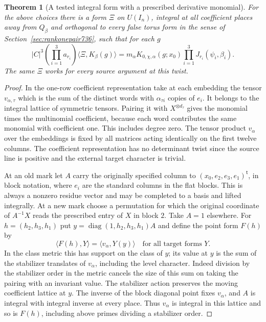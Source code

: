 \documentclass[a4paper,11pt]{article}
\newtheorem{theorem}[proposition]{Theorem}
\theoremstyle{definition}
\theoremstyle{remark}
\numberwithin{equation}{section}
\begin{document}
\begin{theorem}[A tested integral form with a prescribed derivative monomial]
\leavevmode\label{thm:fourblock854}
For the above choices there is a form \(\Xi\) on \(U(I_n)\),
integral at all coefficient places away from \(Q_\beta\)
and orthogonal to every false torus form in the sense of
Section~\ref{sec:rankonepair736}, such that for each \(g\)
\[
 |C|^3\left(\prod_{i=1}^3 a_{r_i}\right)
           \langle\Xi,K_\beta(g)\rangle
    =m_\alpha K_{0,\chi,\alpha}(g;x_0)
                          \prod_{i=1}^3 J_{r_i}(\psi_i,\beta_i).
\]
The same \(\Xi\) works for every source argument at this twist.
\end{theorem}
\begin{proof}
In the one-row coefficient representation take at each
embedding the tensor \(v_{\alpha,\tau}\) which is the sum of
the distinct words with \(\alpha_{\tau i}\) copies of \(e_i\).
It belongs to the integral lattice of symmetric tensors.
Pairing it with \(X^{\otimes d_\tau}\) gives the monomial times
the multinomial coefficient, because each word contributes
the same monomial with coefficient one. This includes degree
zero. The tensor product \(v_\alpha\) over the embeddings is
fixed by all matrices acting identically on the first twelve
columns. The coefficient representation has no determinant
twist since the source line is positive and the external
target character is trivial.

At an old mark let \(A\) carry the originally specified
column to \((x_0,e_2,e_3,e_1)^{\mathsf t}\), in block notation,
where \(e_i\) are the standard columns in the flat blocks.
This is always a nonzero residue vector and may be completed
to a basis and lifted integrally. At a new mark choose a
permutation for which the original coordinate of \(A^{-1}X\)
reads the prescribed entry of \(X\) in block \(2\). Take
\(A=1\) elsewhere. For \(h=(h_2,h_3,h_1)\) put
\(y=\operatorname{diag}(1,h_2,h_3,h_1)A\) and define the
point form \(F(h)\) by
\[
       \langle F(h),Y\rangle=\langle v_\alpha,Y(y)\rangle
                                  \quad\text{for all target forms }Y .
\]
In the class metric this has support on the class of \(y\);
its value at \(y\) is the sum of the stabilizer translates
of \(v_\alpha\), including the level character. Indeed division
by the stabilizer order in the metric cancels the size of this
sum on taking the pairing with an invariant value. The
stabilizer action preserves the moving coefficient lattice
at \(y\). The inverse of the block diagonal point fixes
\(v_\alpha\), and \(A\) is integral with integral inverse
at every place. Thus \(v_\alpha\) is integral in this lattice
and so is \(F(h)\), including above primes dividing a stabilizer
order.


\end{proof}
\end{document}
